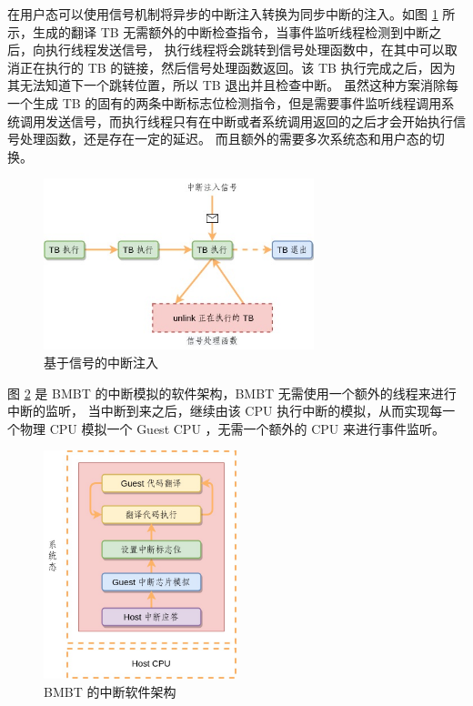 在用户态可以使用信号机制将异步的中断注入转换为同步中断的注入。如图 \ref{fig:signal_interrupt} 所示，生成的翻译 TB 无需额外的中断检查指令，当事件监听线程检测到中断之后，向执行线程发送信号，
执行线程将会跳转到信号处理函数中，在其中可以取消正在执行的 TB 的链接，然后信号处理函数返回。该 TB 执行完成之后，因为其无法知道下一个跳转位置，所以 TB 退出并且检查中断。
虽然这种方案消除每一个生成 TB 的固有的两条中断标志位检测指令，但是需要事件监听线程调用系统调用发送信号，而执行线程只有在中断或者系统调用返回的之后才会开始执行信号处理函数，还是存在一定的延迟。
而且额外的需要多次系统态和用户态的切换。

\begin{figure}[!htbp]
	\centering
	\includegraphics[width=0.7\textwidth]{./images/qemu-signal-interrupt.jpg}
	\caption{基于信号的中断注入}
	\label{fig:signal_interrupt}
\end{figure}

图 \ref{fig:bmbt_interrupt} 是 BMBT 的中断模拟的软件架构，BMBT 无需使用一个额外的线程来进行中断的监听，
当中断到来之后，继续由该 CPU 执行中断的模拟，从而实现每一个物理 CPU 模拟一个 Guest CPU ，无需一个额外的 CPU 来进行事件监听。

\begin{figure}[!htbp]
	\centering
	\includegraphics[width=0.5\textwidth]{./images/bmbt-interrupt.jpg}
	\caption{BMBT 的中断软件架构}
	\label{fig:bmbt_interrupt}
\end{figure}

